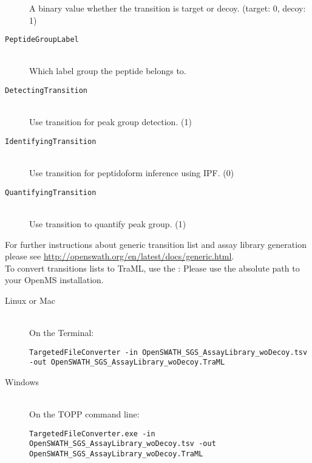 \begin{description}
  A binary value whether the transition is target or decoy. (target: 0, decoy: 1)
  \item[\texttt{PeptideGroupLabel}] \hfill \\
  Which label group the peptide belongs to. \\
  \item[\texttt{DetectingTransition}] \hfill \\
  Use transition for peak group detection. (1)\\
  \item[\texttt{IdentifyingTransition}] \hfill \\
  Use transition for peptidoform inference using IPF. (0)\\
  \item[\texttt{QuantifyingTransition}] \hfill \\
  Use transition to quantify peak group. (1)\\
\end{description}

\noindent For further instructions about generic transition list and assay library generation please see \url{http://openswath.org/en/latest/docs/generic.html}. \\

\noindent To convert transitions lists to TraML, use the : Please use the absolute path to your OpenMS installation. \\

\begin{description}
  \item[Linux or Mac] \hfill \\
    On the Terminal:
    \begin{listing}
\begin{verbatim}
TargetedFileConverter -in OpenSWATH_SGS_AssayLibrary_woDecoy.tsv -out OpenSWATH_SGS_AssayLibrary_woDecoy.TraML
    \end{verbatim}
\end{listing}
  \item[Windows] \hfill \\
    On the TOPP command line:
    \begin{listing}
\begin{verbatim}
TargetedFileConverter.exe -in OpenSWATH_SGS_AssayLibrary_woDecoy.tsv -out OpenSWATH_SGS_AssayLibrary_woDecoy.TraML
    \end{verbatim}
\end{listing}
\end{description}

